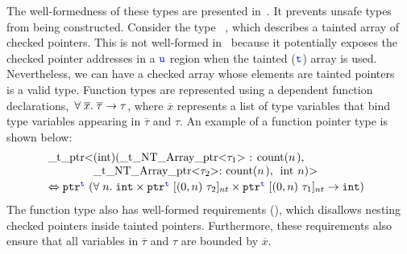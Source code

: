 The well-formedness of these types are presented in~.
It prevents unsafe types from being constructed.
  Consider the type ~, which describes a tainted array of checked pointers.
  This is not well-formed in~\systemname{} because it potentially exposes the checked pointer addresses in a $\textcolor{blue}{\texttt{u}}$ region when the tainted ($\textcolor{blue}{\texttt{t}}$) array is used. 
  Nevertheless, we can have a checked array whose elements are tainted pointers\mzs{,}\mzr{:}~\eg~ is a valid type.
%
Function types are represented using a dependent function declarations,~\ie $\forall \;\overline{x}.\;{\overline{\tau}}\to\tau$,
where $\overline{x}$ represents a list of \tint{} type variables that bind type variables appearing in $\overline{\tau}$ and $\tau$.
An example of a function pointer type is shown below:
\[\hspace*{-0.5em}
\begin{array}{l}
$\code{_t_ptr<(int)(_t_NT_Array_ptr<}$\tau_1$\code{> : count(}$n$\code{),}$\\
\qquad\qquad$\code{_t_NT_Array_ptr<}$\tau_2$\code{>: count(}$n$\code{), int}$\;n$\code{)>}$
\\[0.2em]
\Leftrightarrow\; $\tptr{(\tfun{n}{\tint \times \tntarrayptr{0}{n}{\tau_2}{\tmode} \times \tntarrayptr{0}{n}{\tau_1}{\tmode}}{\tint})}{\tmode}$
\end{array}
\]
The function type also has well-formed requirements (), which disallows nesting checked pointers inside tainted pointers.
Furthermore, these requirements also ensure that all variables in $\overline{\tau}$ and $\tau$ are bounded by $\overline{x}$.

